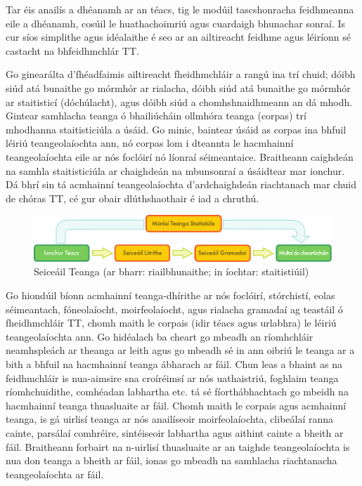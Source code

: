 \begin{multicols}{2}
Tar éis anailís a dhéanamh ar an téacs, tig le modúil tascshonracha feidhmeanna eile a dhéanamh, cosúil le huathachoimriú agus cuardaigh bhunachar sonraí. Is cur síos simplithe agus idéalaithe é seo ar an ailtireacht feidhme agus léiríonn sé castacht na bhfeidhmchlár TT.  

Go ginearálta d’fhéadfaimis ailtireacht fheidhmchláir a rangú ina trí chuid; dóibh siúd atá bunaithe go mórmhór ar rialacha, dóibh siúd atá bunaithe go mórmhór ar staitisticí (dóchúlacht), agus dóibh siúd a chomhshnaidhmeann an dá mhodh. Gintear  samhlacha teanga ó bhailiúcháin ollmhóra teanga (corpas) trí mhodhanna staitisticiúla a úsáid. Go minic, baintear úsáid as corpas ina bhfuil léiriú teangeolaíochta ann, nó corpas lom i dteannta le hacmhainní teangeolaíochta eile ar nós foclóirí nó líonraí séimeantaice. Braitheann caighdeán na samhla staitisticiúla ar chaighdeán na mbunsonraí a úsáidtear mar ionchur. Dá bhrí sin tá acmhainní teangeolaíochta d’ardchaighdeán riachtanach mar chuid de chóras TT, cé gur obair dlúthshaothair é iad a chruthú.

\begin{figure}[htb]
  \center
  \includegraphics[width=\textwidth]{../_media/irish/language_checking}
  \caption{Seiceáil Teanga (ar bharr: riailbhunaithe; in íochtar: staitistiúil)}
  \label{fig:langcheckingaarch_de}
\end{figure}

Go hiondúil bíonn acmhainní teanga-dhírithe ar nós foclóirí, stórchistí, eolas séimeantach, fóneolaíocht, moirfeolaíocht, agus rialacha gramadaí ag teastáil ó fheidhmchláir TT, chomh maith le corpais (idir téacs agus urlabhra) le léiriú teangeolaíochta ann. Go hidéalach ba cheart go mbeadh an ríomhchláir neamhspleách ar theanga ar leith agus go mbeadh sé in ann oibriú le teanga ar a bith a bhfuil na hacmhainní teanga ábharach ar fáil. Chun leas a bhaint as na feidhmchláir is nua-aimsire sna croíréimsí ar nós uathaistriú, foghlaim teanga ríomhchuidithe, comhéadan  labhartha etc. tá sé fíorthábhachtach go mbeidh na hacmhainní teanga thuasluaite ar fáil. Chomh maith le corpais agus acmhainní teanga, is gá uirlisí teanga ar nós anailíseoir moirfeolaíochta, clibeálaí ranna cainte, parsálaí comhréire, sintéiseoir labhartha agus aithint cainte a bheith ar fáil. Braitheann forbairt na n-uirlisí thuasluaite ar an taighde teangeolaíochta is nua don teanga a bheith ar fáil, ionas go mbeadh na samhlacha riachtanacha  teangeolaíochta  ar fáil.


\end{multicols}
